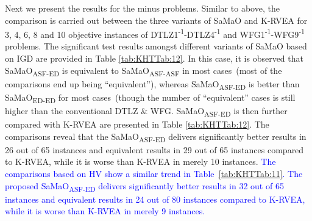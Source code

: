 Next we present the results for the minus problems. Similar to above, the comparison is carried out between the three variants of SaMaO and K-RVEA for 3, 4, 6, 8 and 10 objective instances of DTLZ1\textsuperscript{-1}-DTLZ4\textsuperscript{-1} and WFG1\textsuperscript{-1}-WFG9\textsuperscript{-1} problems. The significant test results amongst different variants of SaMaO based on IGD are provided in Table \ref{tab:KHTTab:12}. {\color{blue}In this case, it is observed that SaMaO\textsubscript{ASF-ED} is equivalent to SaMaO\textsubscript{ASF-ASF} in most cases~(most of the comparisons end up being ``equivalent''), whereas SaMaO\textsubscript{ASF-ED} is better than SaMaO\textsubscript{ED-ED} for most cases~(though the number of ``equivalent'' cases is still higher than the conventional DTLZ \& WFG}. SaMaO\textsubscript{ASF-ED} is then further compared with K-RVEA are presented in Table \ref{tab:KHTTab:12}. The comparisons reveal that the SaMaO\textsubscript{ASF-ED} delivers significantly better results in 26 out of 65 instances and equivalent results in 29 out of 65 instances compared to K-RVEA, while it is worse than K-RVEA in merely 10 instances. \textcolor{blue}{The comparisons based on HV show a similar trend in Table~\ref{tab:KHTTab:11}. The proposed SaMaO\textsubscript{ASF-ED} delivers significantly better results in 32 out of 65 instances and equivalent results in 24 out of 80 instances compared to K-RVEA, while it is worse than K-RVEA in merely 9 instances.}


